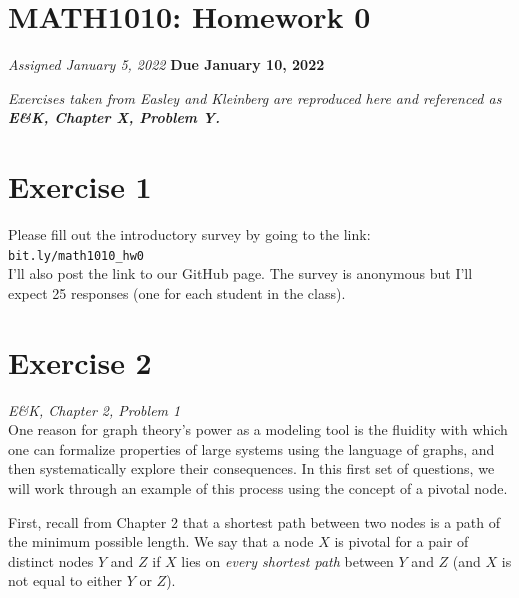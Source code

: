 \documentclass{tufte-handout}
\begin{document}
\begin{fullwidth} 
\section{MATH1010: Homework 0}
    \textit{Assigned January 5, 2022}
    \textbf{Due January 10, 2022}
\vspace{.2cm}
    
\noindent\textit{Exercises taken from Easley and Kleinberg are reproduced here and referenced as \textbf{E\&K, Chapter X, Problem Y.}}    
\section*{\textbf{Exercise 1}}
Please fill out the introductory survey by going to the link: \\\verb|bit.ly/math1010_hw0|\\ 
\noindent I'll also post the link to our GitHub page. The survey is anonymous but I'll expect 25 responses (one for each student in the class).

\section*{\textbf{Exercise 2}}
\textit{E\&K, Chapter 2, Problem 1}\\
One reason for graph theory’s power as a modeling tool is the fluidity with which one can formalize properties of large systems using the language of graphs, and then systematically explore their consequences. In this first set of questions, we will work through an example of this process using the concept of a pivotal node.

First, recall from Chapter 2 that a shortest path between two nodes is a path of the minimum possible length. We say that a node $X$ is pivotal for a pair of distinct nodes $Y$ and $Z$ if $X$ lies on \textit{every shortest path} between $Y$ and $Z$ (and $X$ is not equal to either $Y$ or $Z$). \vspace{.5cm}


\end{fullwidth}
\end{document}
